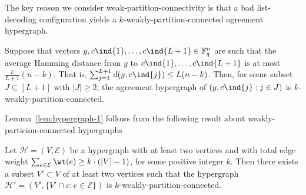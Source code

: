 \documentclass{article}[11pt]
\begin{document}
The key reason we consider weak-partition-connectivity is that a bad list-decoding configuration yields a $k$-weakly-partition-connected agreement hypergraph.
\begin{lemma}
  Suppose that vectors $y,c\ind{1},\dots,c\ind{L+1}\in\mathbb{F}_q^n$ are such that the average Hamming distance from $y$ to $c\ind{1},\dots,c\ind{L+1}$ is at most $\frac{L}{L+1}(n-k)$. That is, $\sum_{j=1}^{L+1}d(y,c\ind{j}) \le L(n-k)$. Then, for some subset $J\subseteq[L+1]$ with $|J|\ge 2$, the agreement hypergraph of $(y,c\ind{j}:j\in  J)$ is $k$-weakly-partition-connected.
  \label{lem:hypergraph-1}
\end{lemma}
Lemma~\ref{lem:hypergraph-1} follows from the following result about weakly-particion-connected hypergraphs
\begin{lemma}
    Let $\mathcal{H}=(V,\mathcal{E})$ be a hypergraph with at least two vertices and with total edge weight $\sum_{e\in\mathcal{E}} \wt(e)\ge k\cdot (|V|-1)$, for some positive integer $k$. Then there exists a subset $V'\subset V$ of at least two vertices such that the hypergraph $\mathcal{H}'=(V', \{V'\cap e: e\in\mathcal{E}\})$ is $k$-weakly-partition-connected.
    \label{lem:hypergraph-0}
\end{lemma}
\end{document}
